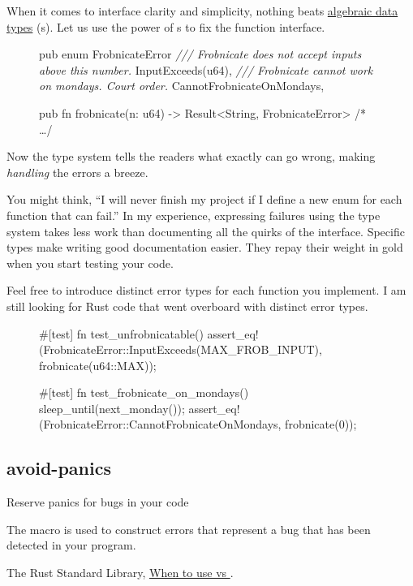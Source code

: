 \documentclass{article}
\begin{document}
When it comes to interface clarity and simplicity, nothing beats \href{https://en.wikipedia.org/wiki/Algebraic_data_type}{algebraic data types} (s).
Let us use the power of s to fix the  function interface.

\begin{figure}
\begin{code}[good]
pub enum FrobnicateError {
  \emph{/// Frobnicate does not accept inputs above this number.}
  InputExceeds(u64),
  \emph{/// Frobnicate cannot work on mondays. Court order.}
  CannotFrobnicateOnMondays,
}

pub fn frobnicate(n: u64) -> Result<String, FrobnicateError> { /* \ldots  */ }
\end{code}
\end{figure}


Now the type system tells the readers what exactly can go wrong, making \emph{handling} the errors a breeze.

You might think, ``I will never finish my project if I define a new enum for each function that can fail.''
In my experience, expressing failures using the type system takes less work than documenting all the quirks of the interface.
Specific types make writing good documentation easier.
They repay their weight in gold when you start testing your code.

Feel free to introduce distinct error types for each function you implement.
I am still looking for Rust code that went overboard with distinct error types.

\begin{figure}
\begin{code}[good]
#[test]
fn test_unfrobnicatable() {
  assert_eq!(FrobnicateError::InputExceeds(MAX_FROB_INPUT), frobnicate(u64::MAX));
}

#[test]
fn test_frobnicate_on_mondays() {
  sleep_until(next_monday());
  assert_eq!(FrobnicateError::CannotFrobnicateOnMondays, frobnicate(0));
}
\end{code}
\end{figure}

\subsection{avoid-panics}{Reserve panics for bugs in your code}
\epigraph{
  The  macro is used to construct errors that represent a bug that has been detected in your program. 
}{The Rust Standard Library, \href{https://doc.rust-lang.org/std/macro.panic.html#when-to-use-panic-vs-result}{When to use  vs }.}
\end{document}
